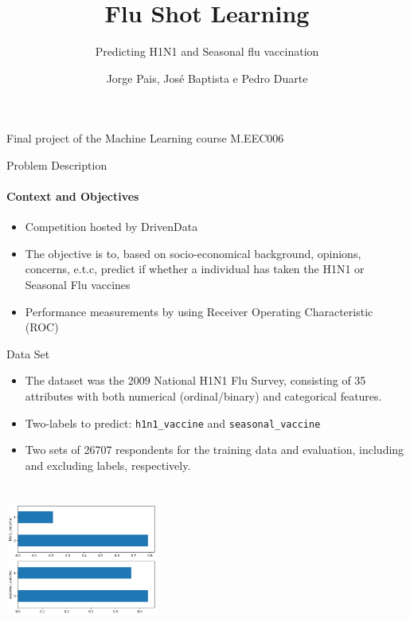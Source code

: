 \documentclass[dvipsnames, handout]{beamer}
\newcommand{\1}{\mathds{1}}	%
\begin{document}

\title{\color{titleText} Flu Shot Learning}
\subtitle{\color{titleText}Predicting H1N1 and Seasonal flu vaccination}
\author{Jorge Pais, José Baptista e Pedro Duarte\vspace{-.3cm}}
\date{}

\begin{frame}
\titlepage
\vspace{-1.2cm}
\begin{center}
    \begin{spacing}{1.2}\scriptsize 
    Final project of the Machine Learning course M.EEC006 
    \end{spacing}
\end{center}
\end{frame}


\begin{frame}{Problem Description}
\framesubtitle{Context and Objectives}

\begin{itemize}
    \item Competition hosted by DrivenData
    \item The objective is to, based on socio-economical background, opinions, concerns, e.t.c, predict if whether a individual has taken the H1N1 or Seasonal Flu vaccines
    \item Performance measurements by using Receiver Operating Characteristic (ROC)
\end{itemize}

\end{frame}

\begin{frame}{Data Set}
\begin{multicols}{2}

\begin{itemize}
    \item The dataset was the 2009 National H1N1 Flu Survey, consisting of 35 attributes with both numerical (ordinal/binary) and categorical features.
    \item Two-labels to predict: \texttt{h1n1\_vaccine} and \texttt{seasonal\_vaccine}
    \item Two sets of 26707 respondents for the training data and evaluation, including and excluding labels, respectively.
\end{itemize} 
\includegraphics[width = 5cm, height = 5cm]{aaa.png}
\end{multicols}
\end{frame}
\end{document}
